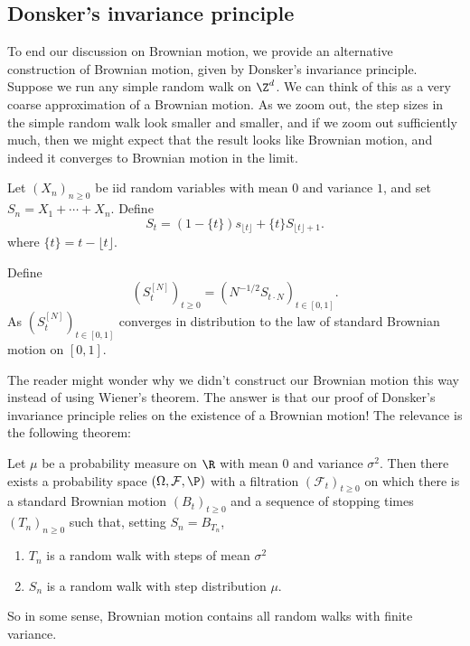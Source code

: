 \documentclass[a4paper]{article}
\begin{document}
\subsection{Donsker's invariance principle}
To end our discussion on Brownian motion, we provide an alternative construction of Brownian motion, given by Donsker's invariance principle. Suppose we run any simple random walk on $\Z^d$. We can think of this as a very coarse approximation of a Brownian motion. As we zoom out, the step sizes in the simple random walk look smaller and smaller, and if we zoom out sufficiently much, then we might expect that the result looks like Brownian motion, and indeed it converges to Brownian motion in the limit.


\begin{thm}
  Let $(X_n)_{n \geq 0}$ be iid random variables with mean $0$ and variance $1$, and set $S_n = X_1 + \cdots + X_n$. Define
  \[
    S_t = (1 - \{t\}) s_{\lfloor t \rfloor} + \{t\} S_{\lfloor t \rfloor + 1}.
  \]
  where $\{t\} = t - \lfloor t \rfloor$.

  Define
  \[
    (S_t^{[N]})_{t \geq 0} = (N^{-1/2} S_{t \cdot N})_{t \in [0, 1]}.
  \]
  As $(S_t^{[N]})_{t \in [0, 1]}$ converges in distribution to the law of standard Brownian motion on $[0, 1]$.
\end{thm}

The reader might wonder why we didn't construct our Brownian motion this way instead of using Wiener's theorem. The answer is that our proof of Donsker's invariance principle relies on the existence of a Brownian motion! The relevance is the following theorem:

\begin{thm}
  Let $\mu$ be a probability measure on $\R$ with mean $0$ and variance $\sigma^2$. Then there exists a probability space $(\Omega, \mathcal{F}, \P)$ with a filtration $(\mathcal{F}_t)_{t \geq 0}$ on which there is a standard Brownian motion $(B_t)_{t \geq 0}$ and a sequence of stopping times $(T_n)_{n \geq 0}$ such that, setting $S_n = B_{T_n}$,
  \begin{enumerate}
    \item $T_n$ is a random walk with steps of mean $\sigma^2$
    \item $S_n$ is a random walk with step distribution $\mu$.
  \end{enumerate}
\end{thm}
So in some sense, Brownian motion contains all random walks with finite variance.
\end{document}

